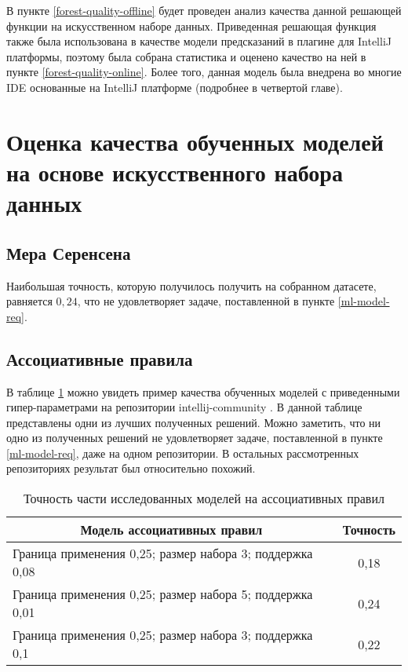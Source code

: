 В пункте \ref{forest-quality-offline} будет проведен анализ качества данной решающей функции на искусственном наборе данных. Приведенная решающая функция также была использована в качестве модели предсказаний в плагине для IntelliJ платформы, поэтому была собрана статистика и оценено качество на ней в пункте \ref{forest-quality-online}. Более того, данная модель была внедрена во многие IDE основанные на IntelliJ платформе (подробнее в четвертой главе).
\section{Оценка качества обученных моделей на основе искусственного набора данных}
    \subsection{Мера Серенсена}\label{coef-quality}
Наибольшая точность, которую получилось получить на собранном датасете, равняется $0,24$, что не удовлетворяет задаче, поставленной в пункте \ref{ml-model-req}.
    \subsection{Ассоциативные правила}\label{rules-quality}
В таблице \ref{ar-offline-result-table} можно увидеть пример качества обученных моделей с приведенными гипер-параметрами на репозитории intellij-community \cite{ij-community}. В данной таблице представлены одни из лучших полученных решений. Можно заметить, что ни одно из полученных решений не удовлетворяет задаче, поставленной в пункте \ref{ml-model-req}, даже на одном репозитории. В остальных рассмотренных репозиториях результат был относительно похожий.
        \begin{table}[!h]
        \caption{Точность части исследованных моделей на ассоциативных правил}\label{ar-offline-result-table}
        \centering
        \begin{tabular}{|l|c|}\hline
        \multicolumn{1}{|c|}{\textbf{Модель ассоциативных правил}} & \textbf{Точность}\\\hline
        Граница применения 0,25; размер набора 3; поддержка 0,08 & 0,18\\\hline
        Граница применения 0,25; размер набора 5; поддержка 0,01  & 0,24 \\\hline
        Граница применения 0,25; размер набора 3; поддержка 0,1  & 0,22\\\hline
        \end{tabular}
        \end{table}
